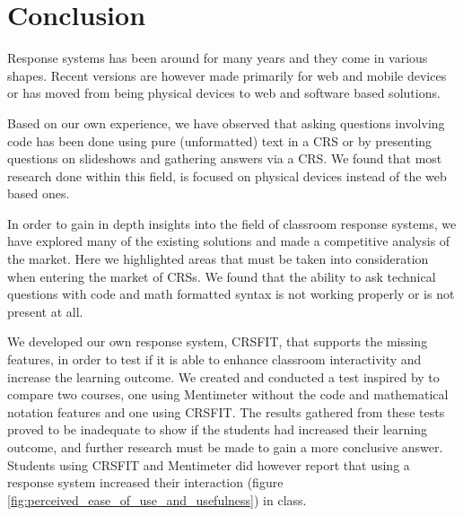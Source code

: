 \section{Conclusion}



Response systems has been around for many years and they come in various shapes. Recent versions are however made primarily for web and mobile devices or has moved from being physical devices to web and software based solutions.

Based on our own experience, we have observed that asking questions involving code has been done using pure (unformatted) text in a CRS or by presenting questions on slideshows and gathering answers via a CRS. We found that most research done within this field, is focused on physical devices instead of the web based ones.

In order to gain in depth insights into the field of classroom response systems, we have explored many of the existing solutions and made a competitive analysis of the market. Here we highlighted areas that must be taken into consideration when entering the market of CRSs. We found that the ability to ask technical questions with code and math formatted syntax is not working properly or is not present at all. 

We developed our own response system, CRSFIT, that supports the missing features, in order to test if it is able to enhance classroom interactivity and increase the learning outcome. We created and conducted a test inspired by  to compare two courses, one using Mentimeter without the code and mathematical notation features and one using CRSFIT. 
The results gathered from these tests proved to be inadequate to show if the students had increased their learning outcome, and further research must be made to gain a more conclusive answer. Students using CRSFIT and Mentimeter did however report that using a response system increased their interaction (figure \ref{fig:perceived_ease_of_use_and_usefulness}) in class.






